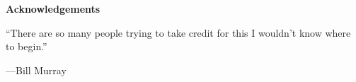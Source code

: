 \clearpage
\begin{centering}
\textbf{ \Large Acknowledgements}\\
\vspace{\baselineskip}
\end{centering}

``There are so many people trying to take credit for this I wouldn't know where to begin.''\\
\begin{center}---Bill Murray\end{center}

\clearpage
